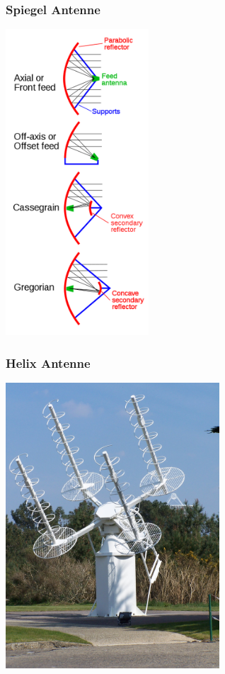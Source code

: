 \begin{frame}
    \frametitle{Spiegel Antenne}
    \begin{center}
        \includegraphics[width=0.4\textwidth]{a09/Parabolic_antenna_types.png}
        \tiny \hyperlink{refs}{\cite{wm}}
	\end{center}
\end{frame}


\begin{frame}
    \frametitle{Helix Antenne}
    \begin{center}
        \includegraphics[width=0.6\textwidth]{a09/Traqueur_acquisition.JPG}
        \tiny \hyperlink{refs}{\cite{wm}}
	\end{center}
\end{frame}

